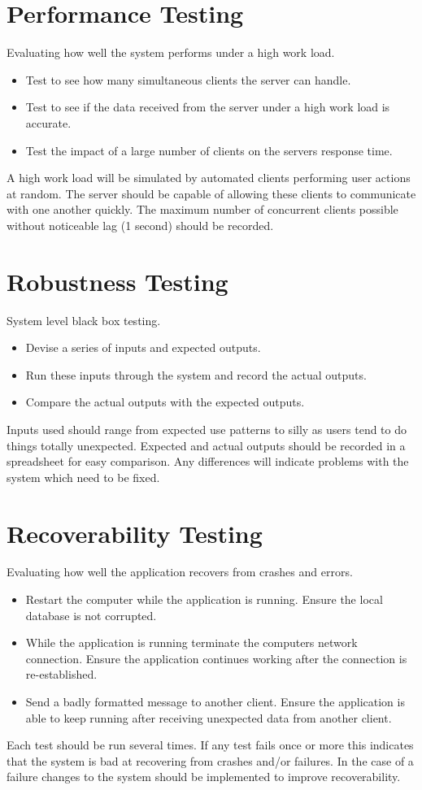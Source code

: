\section{Performance Testing}
Evaluating how well the system performs under a high work load.
\begin{itemize}
\item Test to see how many simultaneous clients the server can handle.
\item Test to see if the data received from the server under a high work load is 
accurate.
\item Test the impact of a large number of clients on the servers response time.
\end{itemize}
A high work load will be simulated by automated clients performing user actions
at random. The server should be capable of allowing these clients to
communicate with one another quickly. The maximum number of concurrent clients 
possible without noticeable lag (1 second) should be recorded.

\section{Robustness Testing}
System level black box testing.  
\begin{itemize}
\item Devise a series of inputs and expected outputs.
\item Run these inputs through the system and record the actual outputs.
\item Compare the actual outputs with the expected outputs.
\end{itemize}
Inputs used should range from expected use patterns to silly as users tend to do 
things totally unexpected. Expected and actual outputs should be recorded in a 
spreadsheet for easy comparison. Any differences will indicate problems with the
system which need to be fixed.

\section{Recoverability Testing}
Evaluating how well the application recovers from crashes and errors.
\begin{itemize}
\item Restart the computer while the application is running.
Ensure the local database is not corrupted.
\item While the application is running terminate the computers network 
connection. Ensure the application continues working after the connection is
re-established.
\item Send a badly formatted message to another client. Ensure the application 
is able to keep running after receiving unexpected data from another client.
\end{itemize}
Each test should be run several times. If any test fails once or more this 
indicates that the system is bad at recovering from crashes and/or failures.
In the case of a failure changes to the system should be implemented to improve
recoverability.

